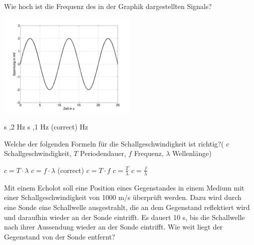 \documentclass[11pt]{exam}
\begin{document}
\setlength{\voffset}{-0.5in}
\setlength{\headsep}{5pt}

\hspace{2mm}
 \hspace{5mm}
\vspace{4mm}

\begin{questions}

\question Wie hoch ist die Frequenz des in der Graphik dargestellten Signals? 

\includegraphics[width=0.5\textwidth]{../../../questions/J/images/SchallSinus1.png}

\begin{choices}
	 s
	,2 Hz
	 s
	,1 Hz (correct)
	 Hz
\end{choices}

\vspace{3mm}\question Welche der folgenden Formeln für die Schallgeschwindigkeit ist richtig?( \( c \) Schallgeschwindigkeit, \(T \) Periodendauer, \( f \) Frequenz, \( \lambda \) Wellenlänge)

\begin{choices}
	\choice \( c=T \cdot \lambda \)
	\choice \( c=f \cdot \lambda \) (correct)
	\choice \( c=T \cdot f \)
	\choice \( c=\frac{T}{\lambda} \)
	\choice \( c=\frac{f}{\lambda} \)
\end{choices}

\vspace{3mm}\question Mit einem Echolot soll eine Position eines Gegenstandes in einem Medium mit einer Schallgeschwindigkeit von 1000 m/s überprüft werden. Dazu wird durch eine Sonde eine Schallwelle ausgestrahlt, die an dem Gegenstand reflektiert wird und daraufhin wieder an der Sonde eintrifft. Es dauert 10 s, bis die Schallwelle nach ihrer Aussendung wieder an der Sonde eintrifft. Wie weit liegt der Gegenstand von der Sonde entfernt?


\end{questions}
\end{document}
